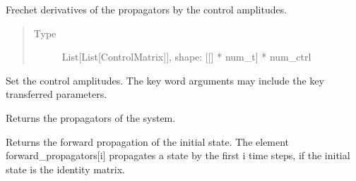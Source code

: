 \documentclass[letterpaper,10pt,english]{sphinxmanual}
\begin{document}
\begin{fulllineitems}
\begin{fulllineitems}
\begin{quote}
\begin{description}
\end{description}\end{quote}

\end{fulllineitems}


\begin{fulllineitems}
\label{\detokenize{qsim:qsim.solver_algorithms.Solver._derivative_prop}}
Frechet derivatives of the propagators by the control amplitudes.
\begin{quote}\begin{description}
\item[{Type}] \leavevmode
List{[}List{[}ControlMatrix{]}{]}, shape: {[}{[}{]} * num\_t{]} * num\_ctrl

\end{description}\end{quote}

\end{fulllineitems}



\begin{fulllineitems}
Set the control amplitudes. The key word arguments may include the
key transferred parameters.

\end{fulllineitems}



\begin{fulllineitems}
Returns the propagators of the system.

\end{fulllineitems}



\begin{fulllineitems}
Returns the forward propagation of the initial state. The element
forward\_propagators{[}i{]} propagates a state by the first i time steps, if
the initial state is the identity matrix.

\end{fulllineitems}




\end{fulllineitems}
\end{document}

